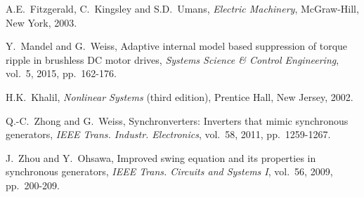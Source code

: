 \documentclass[conference]{IEEEtran}
\newcommand{\m}      {{\hbox{\hskip 1pt}}}
\begin{document}
\begin{thebibliography}{10}
 A.E.~Fitzgerald, C.~Kingsley and S.D.~Umans,
 \m {\em Electric Machinery}, \m McGraw-Hill, New York, 2003.

 Y.~Mandel and G.~Weiss, \m Adaptive internal model
 based suppression of torque ripple in brushless DC motor drives,
 {\em Systems Science \& Control Engineering}, vol.~5, 2015, 
 pp.~162-176.

 H.K.~Khalil, \m \emph{Nonlinear Systems} (third 
 edition), Prentice Hall, New Jersey, 2002.

 Q.-C.~Zhong and G.~Weiss, \m Synchronverters: 
 Inverters that mimic synchronous generators, {\em IEEE Trans. 
 Industr. Electronics}, vol.~58, 2011, pp.~1259-1267.

 J.~Zhou and Y.~Ohsawa, \m Improved swing
 equation and its properties in synchronous generators, {\em
 IEEE Trans. Circuits and Systems I}, vol.~56, 2009, pp.~200-209.

\end{thebibliography}
\end{document}
